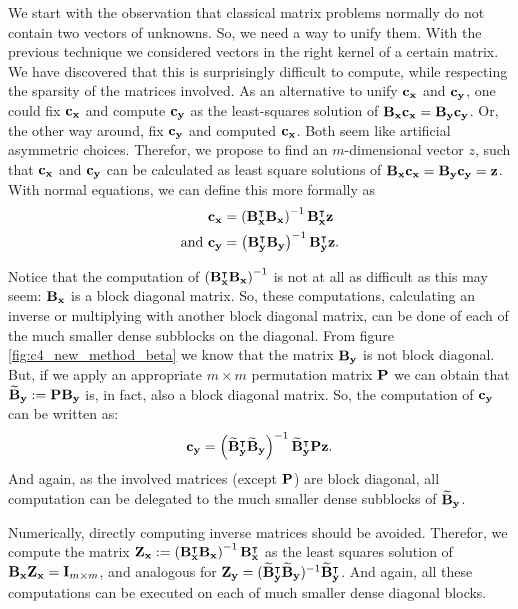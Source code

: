 We start with the observation that classical matrix problems normally do not contain two vectors of unknowns. So, we need a way to unify them. With the previous technique we considered vectors in the right kernel of a certain matrix. We have discovered that this is surprisingly difficult to compute, while respecting the sparsity of the matrices involved. As an alternative to unify $\vb{c_x}$ and $\vb{c_y}$, one could fix $\vb{c_x}$ and compute $\vb{c_y}$ as the least-squares solution of $\vb{B_x}\vb{c_x} = \vb{B_y}\vb{c_y}$. Or, the other way around, fix $\vb{c_y}$ and computed $\vb{c_x}$. Both seem like artificial asymmetric choices. Therefor, we propose to find an $m$-dimensional vector $z$, such that $\vb{c_x}$ and $\vb{c_y}$ can be calculated as least square solutions of $\vb{B_x}\vb{c_x} = \vb{B_y}\vb{c_y} = \vb{z}$. With normal equations, we can define this more formally as
\begin{align*}
    \vb{c_x}            & = \left(\vb{B_x^\intercal} \vb{B_x}\right)^{-1} \vb{B_x^\intercal} \vb{z}          \\
    \text{and }\vb{c_y} & = \left(\vb{B_y^\intercal} \vb{B_y}\right)^{-1} \vb{B_y^\intercal} \vb{z} \text{.}
\end{align*}

Notice that the computation of $\left(\vb{B_x^\intercal} \vb{B_x}\right)^{-1}$ is not at all as difficult as this may seem: $\vb{B_x}$ is a block diagonal matrix. So, these computations, calculating an inverse or multiplying with another block diagonal matrix, can be done of each of the much smaller dense subblocks on the diagonal. From figure \ref{fig:c4_new_method_beta} we know that the matrix $\vb{B_y}$ is not block diagonal. But, if we apply an appropriate $m \times m$ permutation matrix $\vb{P}$ we can obtain that $\vb{\widetilde{B}_y} := \vb{P} \vb{B_y}$ is, in fact, also a block diagonal matrix. So, the computation of $\vb{c_y}$ can be written as:
$$
    \vb{c_y} = \left(\vb{\widetilde{B}_y^\intercal} \vb{\widetilde{B}_y}\right)^{-1} \vb{\widetilde{B}^\intercal_y} \vb{P} \vb{z} \text{.}
$$
And again, as the involved matrices (except $\vb{P}$) are block diagonal, all computation can be delegated to the much smaller dense subblocks of $\vb{\widetilde{B}_y}$.

Numerically, directly computing inverse matrices should be avoided. Therefor, we compute the matrix $\vb{Z_x} := \left(\vb{B_x^\intercal} \vb{B_x}\right)^{-1} \vb{B_x^\intercal}$ as the least squares solution of $\vb{B_x} \vb{Z_x} = \vb{I}_{m \times m}$, and analogous for $\vb{Z_y} = (\vb{\widetilde{B}_y^\intercal} \vb{\widetilde{B}_y})^{-1} \vb{\widetilde{B}^\intercal_y}$. And again, all these computations can be executed on each of much smaller dense diagonal blocks.

